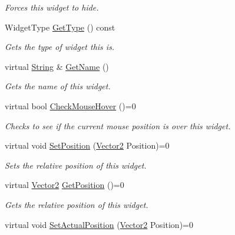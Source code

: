 \begin{DoxyCompactItemize}
\begin{DoxyCompactList}\small\item\em Forces this widget to hide. \item\end{DoxyCompactList}\item 
WidgetType \hyperlink{classphys_1_1UI_1_1Widget_a76337b279bd372ce225f94ab1da191ea}{GetType} () const 
\begin{DoxyCompactList}\small\item\em Gets the type of widget this is. \item\end{DoxyCompactList}\item 
virtual \hyperlink{namespacephys_aa03900411993de7fbfec4789bc1d392e}{String} \& \hyperlink{classphys_1_1UI_1_1Widget_a35d6e7ce60a9b295d8659345627cf7e0}{GetName} ()
\begin{DoxyCompactList}\small\item\em Gets the name of this widget. \item\end{DoxyCompactList}\item 
virtual bool \hyperlink{classphys_1_1UI_1_1Widget_a613df6dbb42efe139d185043a00259dc}{CheckMouseHover} ()=0
\begin{DoxyCompactList}\small\item\em Checks to see if the current mouse position is over this widget. \item\end{DoxyCompactList}\item 
virtual void \hyperlink{classphys_1_1UI_1_1Widget_aae1c0b891125823e7ade8cbc7e4ba6b6}{SetPosition} (\hyperlink{classphys_1_1Vector2}{Vector2} Position)=0
\begin{DoxyCompactList}\small\item\em Sets the relative position of this widget. \item\end{DoxyCompactList}\item 
virtual \hyperlink{classphys_1_1Vector2}{Vector2} \hyperlink{classphys_1_1UI_1_1Widget_a3e464b028b0d1b5755923b8790260c33}{GetPosition} ()=0
\begin{DoxyCompactList}\small\item\em Gets the relative position of this widget. \item\end{DoxyCompactList}\item 
virtual void \hyperlink{classphys_1_1UI_1_1Widget_ac8f70c390e7724e57fc99e51d8004a9b}{SetActualPosition} (\hyperlink{classphys_1_1Vector2}{Vector2} Position)=0

\end{DoxyCompactItemize}
